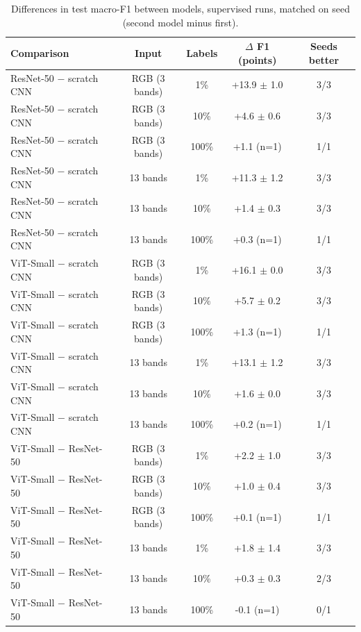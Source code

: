 \begin{table}[t]
\centering
\caption{Differences in test macro-F1 between models, supervised runs, matched on seed (second model minus first).}
\label{tab:model_comparison}
\small
\begin{tabular}{lcccc}
\toprule
Comparison & Input & Labels & $\Delta$ F1 (points) & Seeds better \\
\midrule
ResNet-50 $-$ scratch CNN & RGB (3 bands) & 1\% & +13.9 $\pm$ 1.0 & 3/3 \\
ResNet-50 $-$ scratch CNN & RGB (3 bands) & 10\% & +4.6 $\pm$ 0.6 & 3/3 \\
ResNet-50 $-$ scratch CNN & RGB (3 bands) & 100\% & +1.1 (n=1) & 1/1 \\
ResNet-50 $-$ scratch CNN & 13 bands & 1\% & +11.3 $\pm$ 1.2 & 3/3 \\
ResNet-50 $-$ scratch CNN & 13 bands & 10\% & +1.4 $\pm$ 0.3 & 3/3 \\
ResNet-50 $-$ scratch CNN & 13 bands & 100\% & +0.3 (n=1) & 1/1 \\
ViT-Small $-$ scratch CNN & RGB (3 bands) & 1\% & +16.1 $\pm$ 0.0 & 3/3 \\
ViT-Small $-$ scratch CNN & RGB (3 bands) & 10\% & +5.7 $\pm$ 0.2 & 3/3 \\
ViT-Small $-$ scratch CNN & RGB (3 bands) & 100\% & +1.3 (n=1) & 1/1 \\
ViT-Small $-$ scratch CNN & 13 bands & 1\% & +13.1 $\pm$ 1.2 & 3/3 \\
ViT-Small $-$ scratch CNN & 13 bands & 10\% & +1.6 $\pm$ 0.0 & 3/3 \\
ViT-Small $-$ scratch CNN & 13 bands & 100\% & +0.2 (n=1) & 1/1 \\
ViT-Small $-$ ResNet-50 & RGB (3 bands) & 1\% & +2.2 $\pm$ 1.0 & 3/3 \\
ViT-Small $-$ ResNet-50 & RGB (3 bands) & 10\% & +1.0 $\pm$ 0.4 & 3/3 \\
ViT-Small $-$ ResNet-50 & RGB (3 bands) & 100\% & +0.1 (n=1) & 1/1 \\
ViT-Small $-$ ResNet-50 & 13 bands & 1\% & +1.8 $\pm$ 1.4 & 3/3 \\
ViT-Small $-$ ResNet-50 & 13 bands & 10\% & +0.3 $\pm$ 0.3 & 2/3 \\
ViT-Small $-$ ResNet-50 & 13 bands & 100\% & -0.1 (n=1) & 0/1 \\
\bottomrule
\end{tabular}
\end{table}
